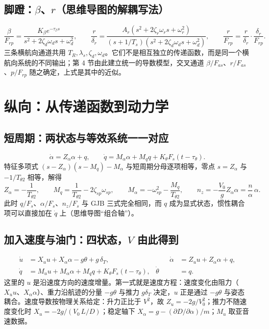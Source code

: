 \documentclass[UTF8,a4paper,11pt,fontset=fandol,scheme=plain]{ctexart}
\begin{document}
\subsection{\texorpdfstring{脚蹬：\(\beta\)、\(r\)（思维导图的解耦写法）}{脚蹬：β、r（思维导图的解耦写法）}}
\begin{equation}
\frac{\beta}{F_{rp}}=\frac{K_\beta e^{-\tau_\beta s}}{s^2+2\zeta_d\omega_d s+\omega_d^2},\qquad
\frac{r}{\delta_r}=\frac{A_r(s^2+2\zeta_r\omega_r s+\omega_r^2)}{(s+1/T_s)(s^2+2\zeta_d\omega_d s+\omega_d^2)},\qquad
\frac{r}{F_{rp}}=\frac{r}{\delta_r}\cdot\frac{\delta_r}{F_{rp}}.
\end{equation}
三条横航向通道共用 \(T_R,\lambda_s,\zeta_d,\omega_d\)。它们不是相互独立的传递函数，而是同一个横航向系统的不同输出；第 4 节由此建立统一的导数模型，交叉通道 \(\beta/F_{as}\)、\(r/F_{as}\)、\(p/F_{rp}\) 随之确定，上式是其中的近似。

\section{纵向：从传递函数到动力学}
\label{sec:lon}
\subsection{短周期：两状态与等效系统一一对应}
\begin{equation}
\dot\alpha=Z_\alpha\alpha+q,\qquad \dot q=M_\alpha\alpha+M_qq+K_\theta F_s(t-\tau_\theta).
\end{equation}
特征多项式 \((s-Z_\alpha)(s-M_q)-M_\alpha\) 与短周期分母逐项相等，零点 \(s=Z_\alpha\) 与 \(-1/T_{\theta2}\) 相等，解得
\begin{equation}
Z_\alpha=-\frac{1}{T_{\theta2}},\qquad M_q=\frac{1}{T_{\theta2}}-2\zeta_{sp}\omega_{sp},\qquad M_\alpha=-\omega_{sp}^2-\frac{M_q}{T_{\theta2}},\qquad n_z=-\frac{V_0}{g}Z_\alpha\alpha=\frac{n}{\alpha}\,\alpha .
\end{equation}
此时 \(q/F_s\)、\(\alpha/F_s\)、\(n_z/F_s\) 与 GJB 三式完全相同，而 \(q\) 成为显式状态，惯性耦合项可以直接加在 \(\dot q\) 上（思维导图“组合轴”）。

\subsection{\texorpdfstring{加入速度与油门：四状态，\(V\) 由此得到}{加入速度与油门：四状态，V 由此得到}}
\begin{equation}
\begin{aligned}
\dot u&=X_uu+X_\alpha\alpha-g\theta+g\,\delta_T, &\qquad \dot\alpha&=Z_uu+Z_\alpha\alpha+q,\\
\dot q&=M_uu+M_\alpha\alpha+M_qq+K_\theta F_s(t-\tau_\theta), & \dot\theta&=q .
\end{aligned}
\label{eq:lon4}
\end{equation}
这里的 \(u\) 是沿速度方向的速度增量。第一式就是速度方程：速度变化由阻力（\(X_u u\)、\(X_\alpha\alpha\)）、重力沿航迹的分量 \(-g\theta\) 与推力 \(g\delta_T\) 决定，\(u\) 正是通过 \(-g\theta\) 与姿态耦合。速度导数按物理关系给定：升力正比于 \(V^2\)，故 \(Z_u=-2g/V_0^2\)；推力不随速度变化时 \(X_u=-2g/(V_0\,L/D)\)；稳定轴下 \(X_\alpha=g-(\partial D/\partial\alpha)/m\)；\(M_u\) 取亚音速数据。
\end{document}
